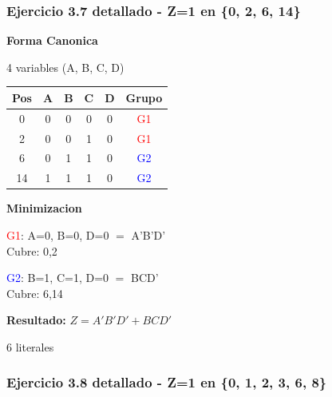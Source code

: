 \documentclass[12pt,a4paper]{article}
\begin{document}
\subsubsection{Ejercicio 3.7 detallado - Z=1 en \{0, 2, 6, 14\}}

\vspace{0.3cm}

\begin{minipage}[t]{0.58\textwidth}
\textbf{Forma Canonica}

4 variables (A, B, C, D)

\begin{tabular}{|c|c|c|c|c|c|}
\hline
Pos & A & B & C & D & Grupo \\
\hline
0  & 0 & 0 & 0 & 0 & \textcolor{red}{G1} \\
2  & 0 & 0 & 1 & 0 & \textcolor{red}{G1} \\
6  & 0 & 1 & 1 & 0 & \textcolor{blue}{G2} \\
14 & 1 & 1 & 1 & 0 & \textcolor{blue}{G2} \\
\hline
\end{tabular}
\end{minipage}
\hspace{0.3cm}
\begin{minipage}[t]{0.38\textwidth}
\textbf{Minimizacion}

\vspace{0.2cm}
\textcolor{red}{G1}: A=0, B=0, D=0 $=$ A'B'D' \\ Cubre: 0,2

\vspace{0.2cm}
\textcolor{blue}{G2}: B=1, C=1, D=0 $=$ BCD' \\ Cubre: 6,14

\vspace{0.3cm}
\textbf{Resultado:} $Z = A'B'D' + BCD'$

6 literales
\end{minipage}

\vspace{0.5cm}

\subsubsection{Ejercicio 3.8 detallado - Z=1 en \{0, 1, 2, 3, 6, 8\}}

\vspace{0.3cm}
\end{document}
